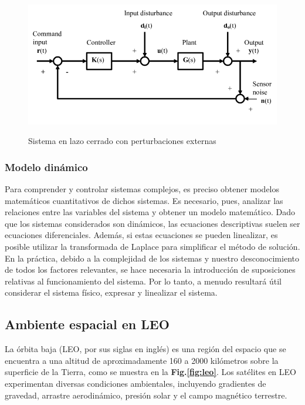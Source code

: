 \begin{figure}[!ht]
	\begin{center}
		\includegraphics[scale=0.5]{imagenes/marco_teorico/lazo cerrado.PNG}\\
	\end{center}
	\caption{  Sistema en lazo cerrado con perturbaciones externas }
	\label{fig:feedback}
\end{figure}
\subsubsection{Modelo dinámico}

Para comprender y controlar sistemas complejos, es preciso obtener modelos matemáticos cuantitativos de dichos sistemas. Es necesario, pues, analizar las relaciones entre las variables del sistema y obtener un modelo matemático. Dado que los sistemas considerados son dinámicos, las ecuaciones descriptivas suelen ser ecuaciones diferenciales. Además, si estas ecuaciones se pueden linealizar, es posible utilizar la transformada de Laplace para simplificar el método de solución. En la práctica, debido a la complejidad de los sistemas y nuestro desconocimiento de todos los factores relevantes, se hace necesaria la introducción de suposiciones relativas al funcionamiento del sistema. Por lo tanto, a menudo resultará útil considerar el sistema físico, expresar y linealizar el sistema.
 
\subsection{Ambiente espacial en LEO}\label{sub:Leo_amb}

La órbita baja (LEO, por sus siglas en inglés) es una región del espacio que se encuentra a una altitud de aproximadamente 160 a 2000 kilómetros sobre la superficie de la Tierra, como se muestra en la \textbf{Fig.\ref{fig:leo}}. Los satélites en LEO experimentan diversas condiciones ambientales, incluyendo gradientes de gravedad, arrastre aerodinámico, presión solar y el campo magnético terrestre. 


